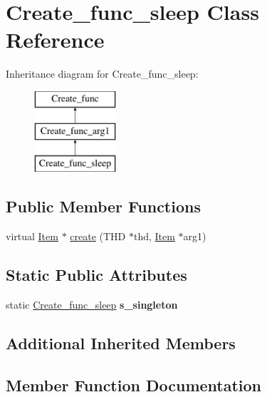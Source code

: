 \hypertarget{classCreate__func__sleep}{}\section{Create\+\_\+func\+\_\+sleep Class Reference}
\label{classCreate__func__sleep}
Inheritance diagram for Create\+\_\+func\+\_\+sleep\+:\begin{figure}[H]
\begin{center}
\leavevmode
\includegraphics[height=3.000000cm]{classCreate__func__sleep}
\end{center}
\end{figure}
\subsection*{Public Member Functions}
\begin{DoxyCompactItemize}
\item 
virtual \mbox{\hyperlink{classItem}{Item}} $\ast$ \mbox{\hyperlink{classCreate__func__sleep_aac44b44aac554c2755b7dd41773b4d29}{create}} (T\+HD $\ast$thd, \mbox{\hyperlink{classItem}{Item}} $\ast$arg1)
\end{DoxyCompactItemize}
\subsection*{Static Public Attributes}
\begin{DoxyCompactItemize}
\item 
\mbox{\label{classCreate__func__sleep_acc269fb3899039fc6723a647c7516501}} 
static \mbox{\hyperlink{classCreate__func__sleep}{Create\+\_\+func\+\_\+sleep}} {\bfseries s\+\_\+singleton}
\end{DoxyCompactItemize}
\subsection*{Additional Inherited Members}


\subsection{Member Function Documentation}
\mbox{\label{classCreate__func__sleep_aac44b44aac554c2755b7dd41773b4d29}} 
